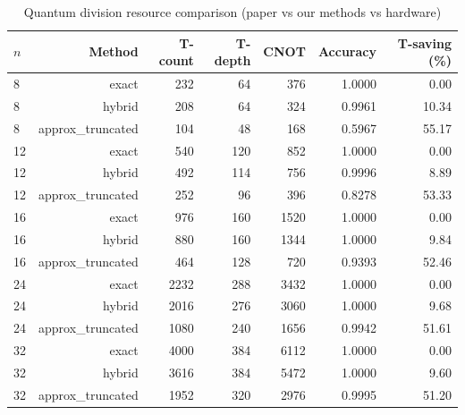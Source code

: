 \begin{table}[ht]
\centering
\small
\begin{tabular}{lrrrrrr}
\toprule
$n$ & Method & T-count & T-depth & CNOT & Accuracy & T-saving (\%) \\
\midrule
8 & exact & 232 & 64 & 376 & 1.0000 & 0.00 \\
\midrule
8 & hybrid & 208 & 64 & 324 & 0.9961 & 10.34 \\
\midrule
8 & approx_truncated & 104 & 48 & 168 & 0.5967 & 55.17 \\
\midrule
12 & exact & 540 & 120 & 852 & 1.0000 & 0.00 \\
\midrule
12 & hybrid & 492 & 114 & 756 & 0.9996 & 8.89 \\
\midrule
12 & approx_truncated & 252 & 96 & 396 & 0.8278 & 53.33 \\
\midrule
16 & exact & 976 & 160 & 1520 & 1.0000 & 0.00 \\
\midrule
16 & hybrid & 880 & 160 & 1344 & 1.0000 & 9.84 \\
\midrule
16 & approx_truncated & 464 & 128 & 720 & 0.9393 & 52.46 \\
\midrule
24 & exact & 2232 & 288 & 3432 & 1.0000 & 0.00 \\
\midrule
24 & hybrid & 2016 & 276 & 3060 & 1.0000 & 9.68 \\
\midrule
24 & approx_truncated & 1080 & 240 & 1656 & 0.9942 & 51.61 \\
\midrule
32 & exact & 4000 & 384 & 6112 & 1.0000 & 0.00 \\
\midrule
32 & hybrid & 3616 & 384 & 5472 & 1.0000 & 9.60 \\
\midrule
32 & approx_truncated & 1952 & 320 & 2976 & 0.9995 & 51.20 \\
\bottomrule
\end{tabular}
\caption{Quantum division resource comparison (paper vs our methods vs hardware)}
\label{tab:comparison}
\end{table}